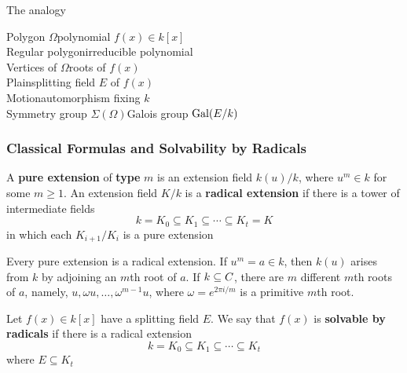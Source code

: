 \documentclass[11pt]{article}
\begin{document}
The analogy
\begin{center}
Polygon \(\Omega\)\dotfill polynomial \(f(x)\in k[x]\)\\
Regular polygon\dotfill irreducible polynomial\\
Vertices of \(\Omega\)\dotfill roots of \(f(x)\)\\
Plain\dotfill splitting field $E$ of \(f(x)\)\\
Motion\dotfill automorphism fixing $k$\\
Symmetry group \(\Sigma(\Omega)\)\dotfill Galois group \(\operatorname{Gal}(E/k)\)
\end{center}
\subsubsection{Classical Formulas and Solvability by Radicals}
\label{sec:org9aaedb5}
\begin{definition}[]
A \textbf{pure extension} of \textbf{type} \(m\) is an extension field \(k(u)/k\), where
\(u^m\in k\) for some \(m\ge1\). An extension field \(K/k\) is a \textbf{radical
extension} if there is a tower of intermediate fields
\begin{equation*}
k=K_0\subseteq K_1\subseteq\cdots\subseteq K_t=K
\end{equation*}
in which each \(K_{i+1}/K_i\) is a pure extension
\end{definition}

Every pure extension is a radical extension. If \(u^m=a\in k\), then
\(k(u)\) arises from \(k\) by adjoining an \(m\)th root of \(a\). If
\(k\subseteq\relax{C}\), there are \(m\) different \(m\)th roots of \(a\), namely,
\(u,\omega u,\dots,\omega^{m-1}u\), where \(\omega=e^{2\pi i/m}\) is a primitive
\(m\)th root.

\begin{definition}[]
Let \(f(x)\in k[x]\) have a splitting field \(E\). We say that \(f(x)\) is
\textbf{solvable by radicals} if there is a radical extension
\begin{equation*}
k=K_0\subseteq K_1\subseteq\cdots\subseteq K_t
\end{equation*}
where \(E\subseteq K_t\)
\end{definition}
\end{document}
